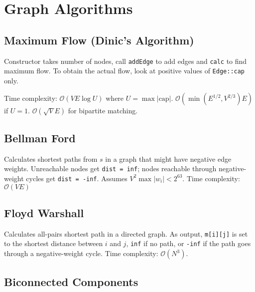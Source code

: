 \documentclass{article}
\begin{document}
\section*{Graph Algorithms}
%

\subsection*{Maximum Flow (Dinic's Algorithm)}

Constructor takes number of nodes, call \lstinline{addEdge} to add edges and \lstinline{calc} to find maximum flow.
To obtain the actual flow, look at positive values of \lstinline{Edge::cap} only.

Time complexity: $\mathcal{O}(VE\log U)$ where $U = \max |\text{cap}|$.
$\mathcal{O}(\min(E^{1/2}, V^{2/3})E)$ if $U = 1$.
$\mathcal{O}(\sqrt{V}E)$ for bipartite matching.



\subsection*{Bellman Ford}

Calculates shortest paths from $s$ in a graph that might have negative edge weights.
Unreachable nodes get \lstinline{dist = inf}; nodes reachable through negative-weight cycles get \lstinline{dist = -inf}.
Assumes $V^2 \max |w_i| < 2^{63}$. Time complexity: $\mathcal{O}(VE)$




\subsection*{Floyd Warshall}
Calculates all-pairs shortest path in a directed graph.
As output, \lstinline{m[i][j]} is set to the shortest distance between $i$ and $j$,
\lstinline{inf} if no path, or \lstinline{-inf} if the path goes through a negative-weight cycle.
Time complexity: $\mathcal{O}(N^3)$.





\subsection*{Biconnected Components}
\end{document}
